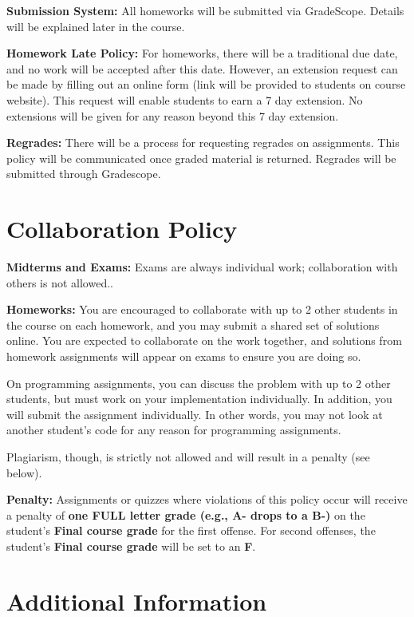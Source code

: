 \documentclass[12pt]{article}
\begin{document}
\textbf{Submission System:} All homeworks will be submitted via GradeScope. Details will be explained later in the course. 

\textbf{Homework Late Policy:} For homeworks, there will be a traditional due date, and no work will be accepted after this date. However, an extension request can be made by filling out an online form (link will be provided to students on course website). This request will enable students to earn a 7 day extension. No extensions will be given for any reason beyond this 7 day extension.

\textbf{Regrades:} There will be a process for requesting regrades on assignments. This policy will be communicated once graded material is returned. Regrades will be submitted through Gradescope.

\section*{Collaboration Policy}

\textbf{Midterms and Exams:} Exams are always individual work; collaboration with others is not allowed..

\textbf{Homeworks:} You are encouraged to collaborate with up to 2 other students in the course on each homework, and you may submit a shared set of solutions online. You are expected to collaborate on the work together, and solutions from homework assignments will appear on exams to ensure you are doing so.

On programming assignments, you can discuss the problem with up to 2 other students, but must work on your implementation individually. In addition, you will submit the assignment individually. In other words, you may not look at another student's code for any reason for programming assignments.

Plagiarism, though, is strictly not allowed and will result in a penalty (see below).

\textbf{Penalty:} Assignments or quizzes where violations of this policy occur will receive a penalty of \textbf{one FULL letter grade (e.g., A- drops to a B-)} on the student's \textbf{Final course grade} for the first offense. For second offenses, the student's \textbf{Final course grade} will be set to an \textbf{F}.

\section*{Additional Information}
\end{document}
